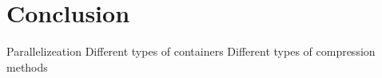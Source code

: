 \chapter{Conclusion}
\label{ch:conclusion}

Parallelizeation
Different types of containers
Different types of compression methods
 